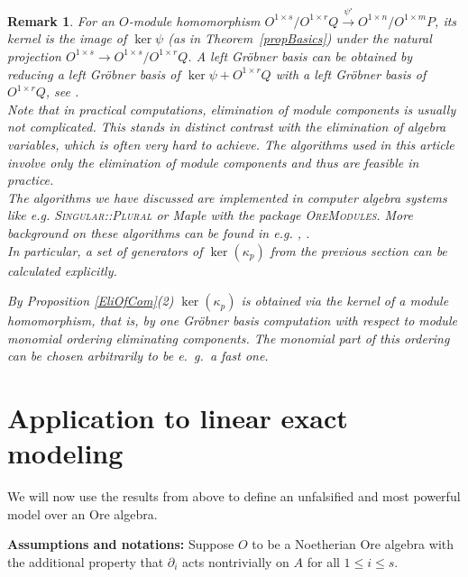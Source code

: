 \documentclass[a4paper,10pt]{article}
\newtheorem{remark}[Th]{Remark}
\theoremstyle{nonumberplain}
\begin{document}
\begin{remark}
For an $O$-module homomorphism 
$O^{1 \times s}/O^{1\times r}Q \!\stackrel{\psi'}{\rightarrow} \!
O^{1 \times n}/O^{1\times m}P$, its kernel is the image of 
$\ker \psi$ (as in Theorem~\ref{propBasics}) under the natural projection 
$O^{1 \times s} \rightarrow O^{1 \times s}/ O^{1\times r}Q$. 
A left Gr\"obner basis can be obtained by reducing a
left Gr\"obner basis of $\ker \psi + O^{1\times r}Q$ with a left 
Gr\"obner basis of $O^{1\times r}Q$, see \cite{LV05}.\\


Note that in practical computations, elimination of module components 
is usually not complicated. This stands in distinct contrast with the 
elimination of algebra variables, which is often very hard to achieve. 
The algorithms used in this article involve only the elimination of 
module components and thus are feasible in practice.\\


The algorithms we have discussed are implemented in computer algebra systems like e.g. \textsc{Singular::Plural} \cite{Plural} or {\sc Maple} \cite{CQR, CS}  with the package \textsc{OreModules}. More background on these algorithms can be found in e.g. \cite{Kr}, \cite{LV05}. \\

In particular, a set of generators of $\ker(\kappa_p)$ from the
previous section can be calculated explicitly.

By Proposition \ref{EliOfCom}(2) $\ker(\kappa_p)$ is obtained via the kernel of a module homomorphism, that is, by one Gr\"obner basis computation with respect to module monomial ordering eliminating components. The monomial part of this ordering can be chosen arbitrarily to be e.~g.~a fast one.
\end{remark}


\section{Application to linear exact modeling}


We will now use the results from above to define an unfalsified and most 
powerful model over an Ore algebra. 

\textbf{Assumptions and notations:}
Suppose $O$ to be a Noetherian Ore algebra with the additional property that 
$\partial_i$ acts nontrivially on $A$ for all $1 \leq i \leq s $.
\end{document}
